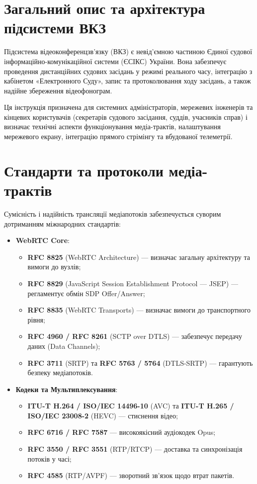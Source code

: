 \documentclass{article}
\begin{document}
\newpage

\section{Загальний опис та архітектура підсистеми ВКЗ}
Підсистема відеоконференцзв’язку (ВКЗ) є невід’ємною частиною Єдиної судової інформаційно-комунікаційної системи (ЄСІКС) України. Вона забезпечує проведення дистанційних судових засідань у режимі реального часу, інтеграцію з кабінетом «Електронного Суду», запис та протоколювання ходу засідань, а також надійне збереження відеофонограм.

Ця інструкція призначена для системних адміністраторів, мережевих інженерів та кінцевих користувачів (секретарів судового засідання, суддів, учасників справ) і визначає технічні аспекти функціонування медіа-трактів, налаштування мережевого екрану, інтеграцію прямого стрімінгу та вбудованої телеметрії.

\section{Стандарти та протоколи медіа-трактів}
Сумісність і надійність трансляції медіапотоків забезпечується суворим дотриманням міжнародних стандартів:
\begin{itemize}
    \item \textbf{WebRTC Core}: 
    \begin{itemize}
        \item \textbf{RFC 8825} (WebRTC Architecture) --- визначає загальну архітектуру та вимоги до вузлів;
        \item \textbf{RFC 8829} (JavaScript Session Establishment Protocol --- JSEP) --- регламентує обмін SDP Offer/Answer;
        \item \textbf{RFC 8835} (WebRTC Transports) --- визначає вимоги до транспортного рівня;
        \item \textbf{RFC 4960 / RFC 8261} (SCTP over DTLS) --- забезпечує передачу даних (Data Channels);
        \item \textbf{RFC 3711} (SRTP) та \textbf{RFC 5763 / 5764} (DTLS-SRTP) --- гарантують безпеку медіапотоків.
    \end{itemize}
    \item \textbf{Кодеки та Мультиплексування}:
    \begin{itemize}
        \item \textbf{ITU-T H.264 / ISO/IEC 14496-10} (AVC) та \textbf{ITU-T H.265 / ISO/IEC 23008-2} (HEVC) --- стиснення відео;
        \item \textbf{RFC 6716 / RFC 7587} --- високоякісний аудіокодек Opus;
        \item \textbf{RFC 3550 / RFC 3551} (RTP/RTCP) --- доставка та синхронізація потоків у часі;
        \item \textbf{RFC 4585} (RTP/AVPF) --- зворотний зв'язок щодо втрат пакетів.
    \end{itemize}
\end{itemize}
\end{document}
